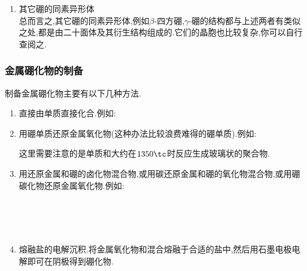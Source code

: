\documentclass{ctexart}
\begin{document}
\begin{enumerate}[label=\tbf{\arabic*.},topsep=0pt,parsep=0pt,itemsep=0pt,partopsep=0pt]
\begin{figure}[H]
{\begin{minipage}[b]{.48\linewidth}
                \end{minipage}
            }
            \caption{$\beta$-三方硼的结构示意图}
        \end{figure}
        至于整体的晶胞,因为太过复杂,故此处不单独展示.如果你有兴趣,可以自行查阅其晶胞\footnote{恕笔者直言,长得有点奇行种.}.
    \item 其它硼的同素异形体\\
        总而言之,其它硼的同素异形体,例如$\beta$-四方硼,$\gamma$-硼的结构都与上述两者有类似之处,都是由二十面体及其衍生结构组成的.它们的晶胞也比较复杂,你可以自行查阅之.
\end{enumerate}
\subsubsection{金属硼化物的制备}
制备金属硼化物主要有以下几种方法.
\begin{enumerate}[label=\tbf{\arabic*.},topsep=0pt,parsep=0pt,itemsep=0pt,partopsep=0pt]
    \item 直接由单质直接化合.例如:
        \begin{center}
        \end{center}
    \item 用硼单质还原金属氧化物(这种办法比较浪费难得的硼单质).例如:
        \begin{center}
        \end{center}
        这里需要注意的是单质和大约在$1350\tc$时反应生成玻璃状的聚合物.
    \item 用还原金属和硼的卤化物混合物,或用碳还原金属和硼的氧化物混合物,或用硼碳化物还原金属氧化物.例如:
        \begin{center}
            \\
            \\
            \\
        \end{center}
    \item 熔融盐的电解沉积.将金属氧化物和混合熔融于合适的盐中,然后用石墨电极电解即可在阴极得到硼化物.
\end{enumerate}
\end{document}
